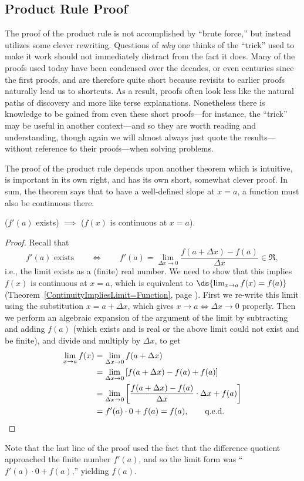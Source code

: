 \subsection{Product Rule Proof}

The proof of the product rule is not accomplished by ``brute force,''
but instead utilizes some clever rewriting.  Questions of {\it why}
one thinks of
the ``trick'' used to make it work should not immediately distract
from the fact it does.  Many of the proofs used today have
been condensed over the decades, or even centuries since the
first proofs, and are therefore quite short because revisits
to earlier proofs naturally lead us to shortcuts.
As a result, proofs often look less like the natural paths
of discovery and more like terse explanations.  Nonetheless
there is knowledge to be gained from even these short
proofs---for instance, the ``trick'' may be useful in another
context---and so they are worth reading and understanding, though
again we will almost always just quote the results---without
reference to their proofs---when solving problems.

The proof of the product rule depends upon another
theorem which is intuitive, is important in its own right, 
and has its own short, somewhat clever proof.
In sum, the theorem says that to have a well-defined slope
at $x=a$, a function must also be continuous there.
\begin{theorem} ($f'(a)$ exists)
 $\implies$ ($f(x)$ is continuous at $x=a$).
\label{DifferentiabilityImpliesContinuityTheorem}\end{theorem}

\begin{proof} Recall that 
$$f'(a) \text{ exists}\qquad \iff \qquad f'(a)=
 \lim_{\Delta x\to0}\frac{f(a+\Delta x)-f(a)}{\Delta x}
  \in\Re,$$
i.e., the limit exists as a (finite) real number.
We need to show that this implies $f(x)$ is continuous at $x=a$,
which is equivalent to $\ds{\lim_{x\to a}f(x)=f(a)}$
(Theorem~\ref{ContinuityImpliesLimit=Function},
page \pageref{ContinuityImpliesLimit=Function}).
First we
re-write this limit using the substitution
$x=a+\Delta x$, which gives
$x\to a\iff\Delta x\to0$ properly.  Then
we perform an algebraic expansion of the argument
of the limit by  subtracting and adding
$f(a)$ (which  exists and is real or the above limit
could not exist and be finite), and divide and multiply
by $\Delta x$, to get
\begin{align*}\lim_{x\to a}f(x)&=
\lim_{\Delta x\to0}f(a+\Delta x)\\
&=\lim_{\Delta x\to0}\left[f(a+\Delta x)-f(a)+f(a)\right]\\
&=\lim_{\Delta x\to0}\left[\frac{f(a+\Delta x)-f(a)}{\Delta x}\cdot\Delta x%
+f(a)\right]\\
&=f'(a)\cdot0+f(a)=f(a), \text{\qquad q.e.d.}
\end{align*}
\end{proof}
Note that the last line of the proof used the fact that
the difference quotient approached the finite number $f'(a)$,
and so the limit form was ``$f'(a)\cdot0+f(a)$,'' yielding $f(a)$.

